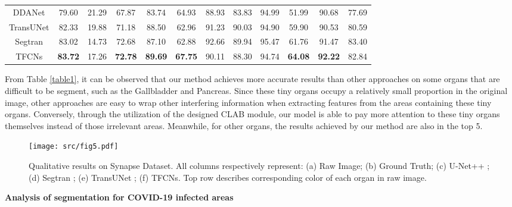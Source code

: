 \documentclass[runningheads]{llncs}
\begin{document}
\begin{table*}
{\begin{tabular}{c|c|c|c|c|c|c|c|c|c|c|c}
    DDANet \cite{tomar2020ddanet}      & 79.60          & 21.29     & 67.87          & 83.74          & 64.93          & 88.93     & 83.83     & 94.99 & 51.99          & 90.68          & 77.69   \\
    TransUNet \cite{chen2021transunet}   & 82.33          & 19.88     & 71.18          & 88.50          & 62.96          & 91.23     & 90.03     & 94.90 & 59.90          & 90.53          & 80.59   \\
    Segtran \cite{zheng2021rethinking}     & 83.02          & 14.73     & 72.68          & 87.10          & 62.88          & 92.66     & 89.94     & 95.47 & 61.76          & 91.47          & 83.40   \\
    TFCNs       & \textbf{83.72} & 17.26     & \textbf{72.78} & \textbf{89.69} & \textbf{67.75} & 90.11     & 88.30     & 94.74 & \textbf{64.08} & \textbf{92.22} & 82.84 \\ \hline
    \end{tabular}}
\end{table*}

From Table \ref{table1}, it can be observed that our method achieves more accurate results than other approaches on some organs that are difficult to be segment, such as the Gallbladder and Pancreas. Since these tiny organs occupy a relatively small proportion in the original image, other approaches are easy to wrap other interfering information when extracting features from the areas containing these tiny organs. Conversely, through the utilization of the designed CLAB module, our model is able to pay more attention to these tiny organs themselves instead of those irrelevant areas. Meanwhile, for other organs, the results achieved by our method are also in the top 5.


\begin{figure}[H]
\centerline{\texttt{[image: src/fig5.pdf]}}
\caption{Qualitative results on Synapse Dataset. All columns respectively represent: (a) Raw Image; (b) Ground Truth; (c) U-Net++ \cite{zhou2018unet++}; (d) Segtran \cite{zheng2021rethinking}; (e) TransUNet \cite{chen2021transunet}; (f) TFCNs. Top row describes corresponding color of each organ in raw image.}
\label{fig3}
\end{figure}
\noindent\textbf{Analysis of segmentation for COVID-19 infected areas}\par
\end{document}
